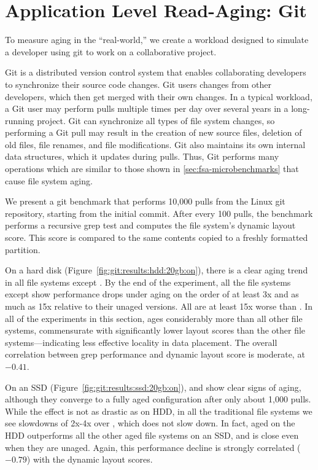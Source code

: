 \section{Application Level Read-Aging: Git}\label{sec:fsa-git}

To measure aging in the ``real-world,'' we create a workload designed to
simulate a developer using git to work on a collaborative project.

Git is a distributed version control system that enables collaborating
developers to synchronize their source code changes.  Git users 
changes from other developers, which then get merged with their own changes.
In a typical workload, a Git user may perform pulls multiple times per day over
several years in a long-running project.  Git can synchronize all types of file
system changes, so performing a Git pull may result in the creation of new
source files, deletion of old files, file renames, and file modifications.  Git
also maintains its own internal data structures, which it updates during pulls.
Thus, Git performs many operations which are similar to those shown in
\cref{sec:fsa-microbenchmarks} that cause file system aging.

We present a git benchmark that performs 10,000 pulls from the Linux git repository, starting
from the initial commit. After every 100 pulls, the benchmark performs a recursive grep
test and computes the file system's dynamic layout score.
This score is compared to the same contents copied to a freshly formatted partition.



On a hard disk (Figure~\ref{fig:git:results:hdd:20gb:on}), there is a clear
aging trend in all file systems except \betrfs.  By the end of the experiment,
all the file systems except \betrfs show performance drops under aging on the
order of at least 3x and as much as 15x relative to their unaged versions. All
are at least 15x worse than \betrfs. In all of the experiments in this section,
\ftwofs ages considerably more than all other file systems, commensurate with
significantly lower layout scores than the other file systems---indicating less
effective locality in data placement. The overall correlation between grep
performance and dynamic layout score is moderate, at $-0.41$. 

On an SSD (Figure~\ref{fig:git:results:ssd:20gb:on}), \btrfs and \xfs show
clear signs of aging, although they converge to a fully aged configuration
after only about 1,000 pulls. While the effect is not as drastic as on HDD, in
all the traditional file systems we see slowdowns of 2x-4x over \betrfs, which
does not slow down.  In fact, aged \betrfs on the HDD outperforms all the other
aged file systems on an SSD, and is close even when they are unaged. Again,
this performance decline is strongly correlated ($-0.79$) with the dynamic
layout scores.

